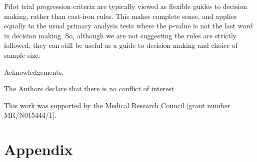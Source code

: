 \documentclass[sagev, Crown]{sagej} %
\begin{document}
Pilot trial progression criteria are typically viewed as flexible guides to decision making, rather than cast-iron rules. This makes complete sense, and applies equally to the usual primary analysis tests where the p-value is not the last word in decision making. So, although we are not suggesting the rules are strictly followed, they can still be useful as a guide to decision making and choice of sample size.


\begin{acks}
Acknowledgements.
\end{acks}

\begin{dci}
The Authors declare that there is no conflict of interest.
\end{dci}

\begin{funding}
This work was supported by the Medical Research Council [grant number MR/N015444/1].
\end{funding}




\section*{Appendix}
\end{document}
